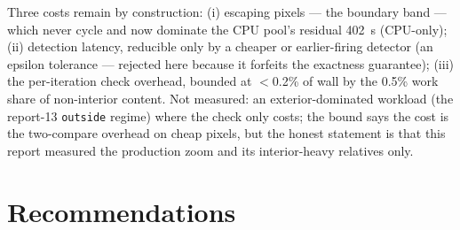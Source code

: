 \documentclass[
	english,
	letterpaper, oneside
]{article}
\begin{document}
Three costs remain by construction: (i) escaping pixels --- the boundary band
--- which never cycle and now dominate the CPU pool's residual 402~s
(CPU-only); (ii) detection latency, reducible only by a cheaper or
earlier-firing detector (an epsilon tolerance --- rejected here because it
forfeits the exactness guarantee); (iii) the per-iteration check overhead,
bounded at $<$0.2\% of wall by the 0.5\% work share of non-interior content.
Not measured: an exterior-dominated workload (the report-13 \texttt{outside}
regime) where the check only costs; the bound says the cost is the two-compare
overhead on cheap pixels, but the honest statement is that this report
measured the production zoom and its interior-heavy relatives only.

\section{Recommendations}
\label{sec:recs}
\end{document}
